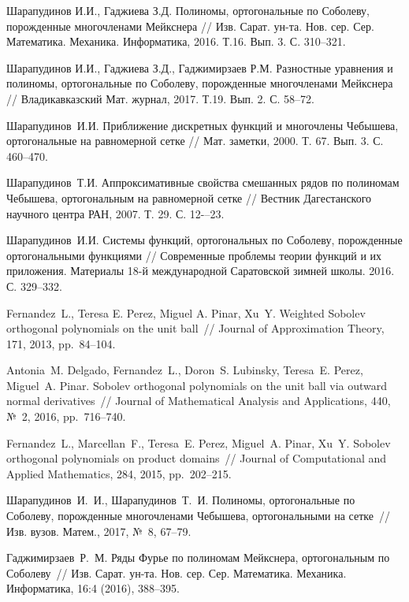 \begin{thebibliography}{20}
{Шарапудинов И.И., Гаджиева З.Д.}
Полиномы, ортогональные по Соболеву, порожденные многочленами Мейкснера // Изв. Сарат. ун-та. Нов. сер. Сер. Математика. Механика. Информатика,
2016. Т.16. Вып. 3. С. 310--321.


{Шарапудинов И.И., Гаджиева З.Д., Гаджимирзаев Р.М.}
Разностные уравнения и полиномы, ортогональные по Соболеву, порожденные многочленами Мейкснера //
Владикавказский Мат. журнал, 2017. Т.19. Вып. 2. С. 58--72.


{Шарапудинов~И.И.}
Приближение дискретных функций и многочлены Чебышева, ортогональные на равномерной сетке //
Мат. заметки, 2000. Т. 67. Вып. 3. С. 460--470.


{Шарапудинов~Т.И.}
Аппроксимативные свойства смешанных рядов по полиномам Чебышева, ортогональным на равномерной сетке //
Вестник Дагестанского научного центра РАН, 2007. Т. 29. С. 12-–23.


{Шарапудинов~И.И.}
Системы функций, ортогональных по Соболеву, порожденные ортогональными функциями //
Современные проблемы теории функций и их приложения.  Материалы 18-й международной Саратовской зимней школы. 2016. С. 329--332.


{Fernandez~L., Teresa E. Perez, Miguel A. Pinar, Xu~Y.} Weighted Sobolev orthogonal polynomials on the unit ball~// Journal of Approximation Theory, 171, 2013, pp.~84--104.


{Antonia~M. Delgado, Fernandez~L., Doron~S. Lubinsky, Teresa~E. Perez, Miguel~A. Pinar.} Sobolev orthogonal polynomials on the unit ball via outward normal derivatives~// Journal of Mathematical Analysis and Applications, 440, №~2, 2016, pp.~716--740.


{Fernandez~L., Marcellan~F., Teresa~E. Perez, Miguel~A. Pinar, Xu~Y.} Sobolev orthogonal polynomials on product domains~// Journal of Computational and Applied Mathematics, 284, 2015, pp.~202--215.


{Шарапудинов~И.~И., Шарапудинов~Т.~И.} Полиномы, ортогональные по Соболеву, порожденные многочленами Чебышева, ортогональными на сетке~// Изв. вузов. Матем., 2017, №~8, 67--79.


{Гаджимирзаев~Р.~М.} Ряды Фурье по полиномам Мейкснера, ортогональным по Соболеву~// Изв. Сарат. ун-та. Нов. сер. Сер. Математика. Механика. Информатика, 16:4 (2016), 388--395.



\end{thebibliography}
